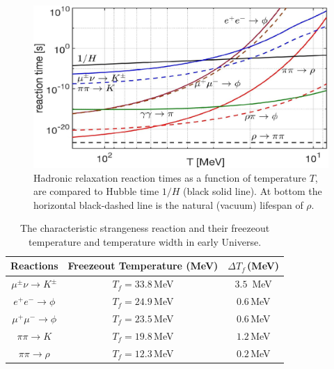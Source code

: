 \documentclass[Universe,article,submit,moreauthors,pdftex]{Definitions/mdpi}
\begin{document}
\begin{itemize}
\begin{figure}[ht]
\centering
\includegraphics[width=0.9\linewidth]{Strangeness_Hubble_C.jpg}
\caption{Hadronic relaxation reaction times as a function of temperature $T$, are compared to Hubble time $1/H$ (black solid line). At bottom the horizontal black-dashed line is the natural (vacuum) lifespan of $\rho$.}
\label{reaction_time_tot}
\end{figure}
\begin{table}%
\caption{The characteristic strangeness reaction and their freezeout temperature and temperature width in early Universe.}
\label{FreezeoutTemperature_table} 
\centering
\begin{tabular}{c| c| c}
\hline\hline
Reactions &Freezeout Temperature (MeV) & {$\Delta T_f$\,(MeV)} \\
\hline
$\mu^\pm\nu\rightarrow K^\pm$ & $T_f=33.8$\,MeV & {$3.5$ \,MeV}\\ 
\hline
$e^+e^-\rightarrow \phi$ & $T_f=24.9$\,MeV &{$0.6$\,MeV}\\
$\mu^+\mu^-\rightarrow\phi$ & $T_f=23.5$\,MeV &{$0.6$\,MeV}\\
\hline
 $\pi\pi\rightarrow K$ & $T_f=19.8$\,MeV&{$1.2$\,MeV}\\
\hline
$\pi\pi\rightarrow\rho$ & $T_f=12.3$\,MeV&{$0.2$\,MeV}\\
\hline\hline
\end{tabular}
\end{table}




\end{itemize}
\end{document}
